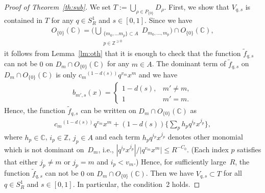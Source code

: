 \documentclass[pdftex]{sigma}
\numberwithin{equation}{section}
\begin{document}
\begin{proof}[Proof of Theorem~\ref{th:sub}] We set $T:=\bigcup_{\rho \in P_{\{0\}}} D_{\rho}$. First, we show that $V_{q,s}$ is contained in $T$ for any $q \in S_R^1$ and $s \in [0,1]$. Since we have
\begin{gather*}
O_{\{0\}}({\mathbb C}) = \Bigg( \bigcup_{\substack{\{m_0, \dots m_p\} \subset A \\ p \in {\mathbb Z}^{\geq 0}}} D_{m_0, \dots, m_p} \Bigg) \cap O_{\{0\}}({\mathbb C}),
\end{gather*}
it follows from Lemma~\ref{lm:oth} that it is enough to check that the function $\tilde{f}_{q,s}$ can not be $0$ on $D_m \cap O_{\{0\}}({\mathbb C})$ for any $m \in A$.
The dominant term of $\tilde{f}_{q,s}$ on $D_m \cap O_{\{0\}}({\mathbb C})$ is only ${c_{m}}^{(1-d(s))}q^{v_m}x^m$ and we have
\begin{gather*}
b_{m',s}(x) =
\begin{cases}
1-d(s), & m' \neq m, \\
 1 & m' =m.
\end{cases}
\end{gather*}
Hence, the function $\tilde{f}_{q,s}$ can be written on $D_m \cap O_{\{0\}}({\mathbb C})$ as
\begin{gather*}
{c_{m}}^{(1-d(s))}q^{v_m}x^m+(1-d(s)) \bigg\{\sum_{p} h_pq^{i_p}x^{j_p} \bigg\},
\end{gather*}
where $h_p \in {\mathbb C}$, $i_p \in {\mathbb Z}$, $j_p \in A$ and each term $h_pq^{i_p}x^{j_p}$ denotes other monomial which is not dominant on~$D_m$, i.e., $|q^{i_p}x^{j_p}|/|q^{v_m}x^m| \leq R^{-C_0}$. (Each index $p$ satisf\/ies that either $j_p \neq m$ or $j_p = m$ and $i_p < v_m$.) Hence, for suf\/f\/iciently large~$R$, the function $\tilde{f}_{q,s}$ can not be $0$ on $D_m \cap O_{\{0\}}({\mathbb C})$. Then we have $V_{q,s} \subset T$ for all $q \in S_R^1$ and $s \in [0,1]$. In particular, the condition~2 holds.


\end{proof}
\end{document}
